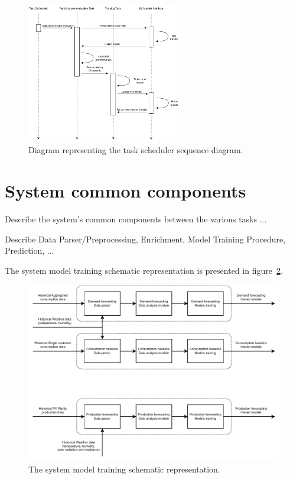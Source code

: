 \begin{figure}[H]
\centering 
\includegraphics[width=0.6\textwidth]{images/architecture_scheduler_sequence}
\caption{Diagram representing the task scheduler sequence diagram.}
\label{fig:schedulersequence}
\end{figure}


\section{System common components}
\label{sec:components}
\vspace{0.2 cm}

Describe the system's common components between the various tasks ...

Describe Data Parser/Preprocessing, Enrichment, Model Training Procedure, Prediction, ...

The system model training schematic representation is presented in figure~\ref{fig:modeltraining}.

\begin{figure}[H]
\centering 
\includegraphics[width=1\textwidth]{images/system_model_training}
\caption{The system model training schematic representation.}
\label{fig:modeltraining}
\end{figure}


